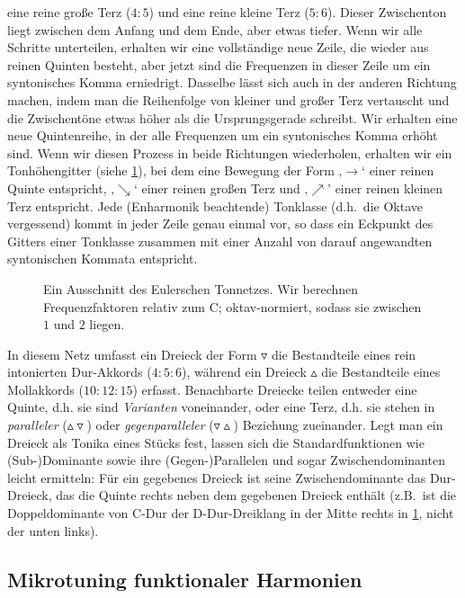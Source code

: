 \documentclass[ngerman,11pt]{scrartcl}
\begin{document}
eine reine große Terz ($4:5$) und eine reine kleine Terz ($5:6$). Dieser
Zwischenton liegt zwischen dem Anfang und dem Ende, aber etwas tiefer. Wenn wir
alle Schritte unterteilen, erhalten wir eine vollständige neue Zeile, die wieder
aus reinen Quinten besteht, aber jetzt sind die Frequenzen in dieser Zeile um
ein syntonisches Komma erniedrigt. Dasselbe lässt sich auch in der anderen
Richtung machen, indem man die Reihenfolge von kleiner und großer Terz
vertauscht und die Zwischentöne etwas höher als die Ursprungsgerade schreibt.
Wir erhalten eine neue Quintenreihe, in der alle Frequenzen um ein syntonisches
Komma erhöht sind. Wenn wir diesen Prozess in beide Richtungen wiederholen,
erhalten wir ein Tonhöhengitter (siehe \cref{fig:latticeExcerpt}), bei dem eine
Bewegung der Form ‚$\to$‘ einer reinen Quinte entspricht, ‚$\searrow$‘ einer
reinen großen Terz und ‚$\nearrow$’ einer reinen kleinen Terz entspricht. Jede
(Enharmonik beachtende) Tonklasse (d.h.\ die Oktave vergessend) kommt in jeder
Zeile genau einmal vor, so dass ein Eckpunkt des Gitters einer Tonklasse
zusammen mit einer Anzahl von darauf angewandten syntonischen Kommata
entspricht.

\begin{figure}[h]
  
  \caption{Ein Ausschnitt des Eulerschen Tonnetzes. Wir berechnen
  	Frequenzfaktoren relativ zum C; oktav-normiert, sodass sie zwischen $1$
  	und $2$ liegen.}\label{fig:latticeExcerpt}
\end{figure}

In diesem Netz umfasst ein Dreieck der Form $\triangledown$ die Bestandteile 
eines rein intonierten Dur-Akkords ($4:5:6$), während ein Dreieck $\vartriangle$
die Bestandteile eines Mollakkords ($10:12:15$) erfasst. Benachbarte Dreiecke
teilen entweder eine Quinte, d.h. sie sind \emph{Varianten} voneinander, oder
eine Terz, d.h. sie stehen in \emph{paralleler}
($\vartriangle\!\!\!\triangledown$) oder \emph{gegenparalleler}
($\triangledown\!\!\!\vartriangle$) Beziehung zueinander. Legt man ein Dreieck
als Tonika eines Stücks fest, lassen sich die Standardfunktionen wie
(Sub-)Dominante sowie ihre (Gegen-)Parallelen und sogar Zwischendominanten
leicht ermitteln: Für ein gegebenes Dreieck ist seine Zwischendominante das
Dur-Dreieck, das die Quinte rechts neben dem gegebenen Dreieck enthält (z.B.\
ist die Doppeldominante von C-Dur der D-Dur-Dreiklang in der Mitte rechts in
\cref{fig:latticeExcerpt}, nicht der unten links).

\subsection{Mikrotuning funktionaler Harmonien}
\end{document}
